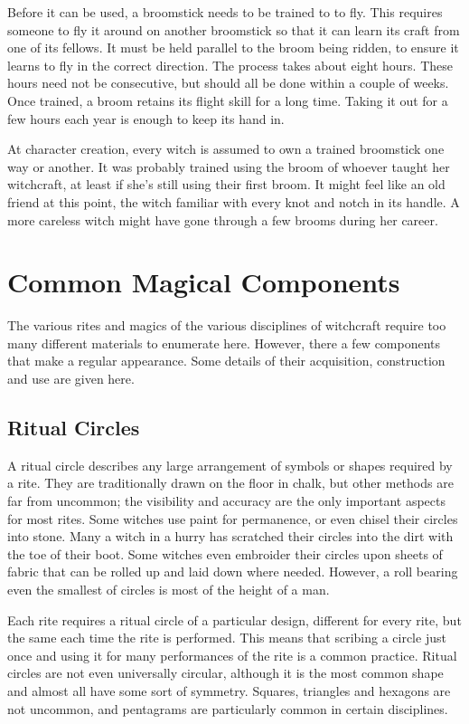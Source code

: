 Before it can be used, a broomstick needs to be trained to to fly.
This requires someone to fly it around on another broomstick so that it can learn its craft from one of its fellows.
It must be held parallel to the broom being ridden, to ensure it learns to fly in the correct direction.
The process takes about eight hours.
These hours need not be consecutive, but should all be done within a couple of weeks.
Once trained, a broom retains its flight skill for a long time.
Taking it out for a few hours each year is enough to keep its hand in.

At character creation, every witch is assumed to own a trained broomstick one way or another.
It was probably trained using the broom of whoever taught her witchcraft, at least if she's still using their first broom.
It might feel like an old friend at this point, the witch familiar with every knot and notch in its handle.
A more careless witch might have gone through a few brooms during her career.



\section{Common Magical Components}

The various rites and magics of the various disciplines of witchcraft require too many different materials to enumerate here.
However, there a few components that make a regular appearance.
Some details of their acquisition, construction and use are given here.

\subsection{Ritual Circles}

A ritual circle describes any large arrangement of symbols or shapes required by a rite.
They are traditionally drawn on the floor in chalk, but other methods are far from uncommon; the visibility and accuracy are the only important aspects for most rites.
Some witches use paint for permanence, or even chisel their circles into stone.
Many a witch in a hurry has scratched their circles into the dirt with the toe of their boot.
Some witches even embroider their circles upon sheets of fabric that can be rolled up and laid down where needed.
However, a roll bearing even the smallest of circles is most of the height of a man.

Each rite requires a ritual circle of a particular design, different for every rite, but the same each time the rite is performed.
This means that scribing a circle just once and using it for many performances of the rite is a common practice.
Ritual circles are not even universally circular, although it is the most common shape and almost all have some sort of symmetry.
Squares, triangles and hexagons are not uncommon, and pentagrams are particularly common in certain disciplines.

